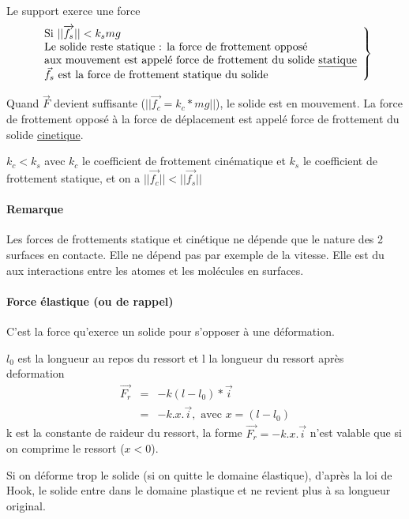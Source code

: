 Le support exerce une force \[
	\left.
	\begin{array}{l}
		\text{Si } ||\overrightarrow{f_s}|| < k_smg\\
	\text{Le solide reste statique : la force de frottement opposé} \\
	\text{aux mouvement est appelé force de frottement du solide \ul{statique}}\\
	\text{$\vec{f_s}$ est la force de frottement statique du solide}
	\end{array}
	\right\}
\]

Quand $\vec{F}$ devient suffisante ($||\overrightarrow{f_c} = k_c*mg||$), le solide est en mouvement. La force de frottement opposé à la force de déplacement est appelé force de frottement du solide \ul{cinetique}.

$k_c < k_s$ avec $k_c$ le coefficient de frottement cinématique et $k_s$ le coefficient de frottement statique, et on a $||\overrightarrow{f_c}|| < ||\overrightarrow{f_s}||$
\paragraph{Remarque} Les forces de frottements statique et cinétique ne dépende que le nature des 2 surfaces en contacte. Elle ne dépend pas par exemple de la vitesse.
Elle est du aux interactions entre les atomes et les molécules en surfaces.

\newpage

\paragraph{Force élastique (ou de rappel)} C'est la force qu'exerce un solide pour s'opposer à une déformation.

\begin{wrapfigure}{r}{0pt}
\end{wrapfigure}
$l_0$ est la longueur au repos du ressort et l la longueur du ressort après deformation
\begin{align*}
	\overrightarrow{F_r} &=& -k(l-l_0)*\vec{i} \\
										&=& -k.x.\vec{i}, \text{ avec }x=(l-l_0)
\end{align*}
k est la constante de raideur du ressort, la forme $\vec{F_r} = -k.x.\vec{i}$ n'est valable que si on comprime le ressort ($x<0$).

Si on déforme trop le solide (si on quitte le domaine élastique), d'après la loi de Hook, le solide entre dans le domaine plastique et ne revient plus à sa longueur original.
